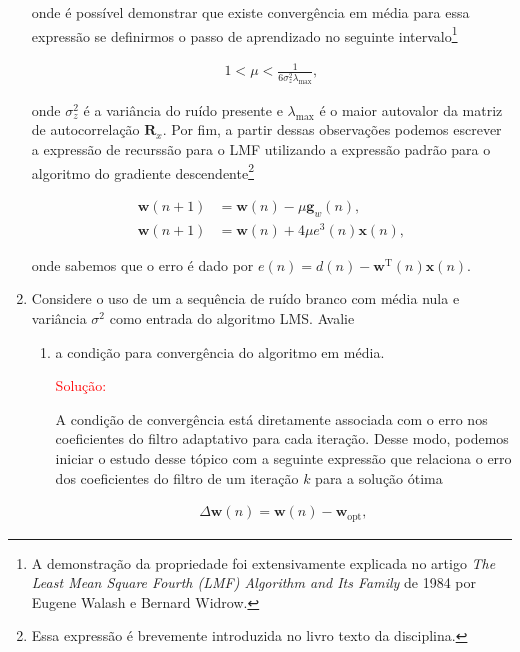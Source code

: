 \documentclass[a4paper,10pt]{article}
\begin{document}
\begin{enumerate}
				onde é possível demonstrar que existe convergência em média para essa expressão se definirmos o passo de aprendizado no seguinte intervalo\footnote{A demonstração da propriedade foi extensivamente explicada no artigo \textit{The Least Mean Square Fourth (LMF) Algorithm and Its Family} de 1984 por Eugene Walash e Bernard Widrow.}

				\begin{align}
					1 < \mu < \frac{1}{6 \sigma^{2}_{z} \lambda_{\text{max}}},
				\end{align}

				onde $\sigma^{2}_{z}$ é a variância do ruído presente e $\lambda_{\text{max}}$ é o maior autovalor da matriz de autocorrelação $\mathbf{R}_{x}$. Por fim, a partir dessas observações podemos escrever a expressão de recurssão para o LMF utilizando 
				a expressão padrão para o algoritmo do gradiente descendente\footnote{Essa expressão é brevemente introduzida no livro texto da disciplina.}

				\begin{align}
					\mathbf{w}(n + 1) &= \mathbf{w}(n) - \mu \mathbf{g}_{w}(n), \\
					\mathbf{w}(n + 1) &= \mathbf{w}(n) + 4 \mu e^{3}(n) \mathbf{x}(n),
				\end{align}

				onde sabemos que o erro é dado por $e(n) = d(n) - \mathbf{w}^{\text{T}}(n)\mathbf{x}(n)$.

			\item Considere o uso de um a sequência de ruído branco com média nula e variância $\sigma^{2}$ como entrada do algoritmo LMS. Avalie
				
				\begin{enumerate}
					
					\item a condição para convergência do algoritmo em média.
					
						\textcolor{red}{Solução:}
						
						A condição de convergência está diretamente associada com o erro nos coeficientes do filtro adaptativo para cada iteração.
						Desse modo, podemos iniciar o estudo desse tópico com a seguinte expressão que relaciona o erro dos coeficientes do filtro de um iteração
						$k$ para a solução ótima
						
						\begin{align}
							\Delta \mathbf{w}(n) = \mathbf{w}(n) - \mathbf{w}_{\text{opt}},
						\end{align}


\end{enumerate}
\end{enumerate}
\end{document}
